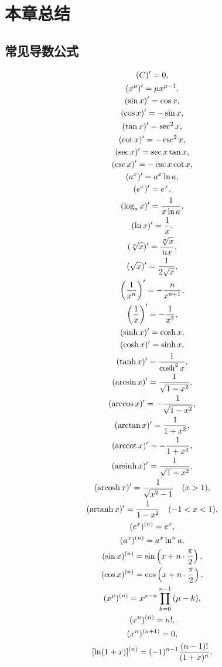 \section{本章总结}
\subsection{常见导数公式}
\begin{gather*}
(C)' = 0, \\
(x^\mu)' = \mu x^{\mu-1}, \\
(\sin x)' = \cos x, \\
(\cos x)' = - \sin x, \\
(\tan x)' = \sec^2 x, \\
(\cot x)' = - \csc^2 x, \\
(\sec x)' = \sec x \tan x, \\
(\csc x)' = - \csc x \cot x, \\
(a^x)' = a^x \ln a, \\
(e^x)' = e^x, \\
(\log_a x)' = \frac{1}{x \ln a}, \\
(\ln x)' = \frac{1}{x}, \\
(\sqrt[n]{x})' = \frac{\sqrt[n]{x}}{n x}, \\
(\sqrt{x})' = \frac{1}{2\sqrt{x}}, \\
\left(\frac{1}{x^n}\right)' = -\frac{n}{x^{n+1}}, \\
\left(\frac{1}{x}\right)' = -\frac{1}{x^2}, \\
(\sinh x)' = \cosh x, \\
(\cosh x)' = \sinh x, \\
(\tanh x)' = \frac{1}{\cosh^2 x}, \\
(\arcsin x)' = \frac{1}{\sqrt{1 - x^2}}, \\
(\arccos x)' = - \frac{1}{\sqrt{1 - x^2}}, \\
(\arctan x)' = \frac{1}{1 + x^2}, \\
(\arccot x)' = - \frac{1}{1 + x^2}, \\
(\arsinh x)' = \frac{1}{\sqrt{1 + x^2}}, \\
(\arcosh x)' = \frac{1}{\sqrt{x^2 - 1}} \quad (x > 1), \\
(\artanh x)' = \frac{1}{1 - x^2} \quad (-1 < x < 1), \\
(e^x)^{(n)} = e^x, \\
(a^x)^{(n)} = a^x \ln^n a, \\
(\sin x)^{(n)} = \sin \left( x + n \cdot \frac{\pi}{2} \right), \\
(\cos x)^{(n)} = \cos \left( x + n \cdot \frac{\pi}{2} \right), \\
(x^\mu)^{(n)} = x^{\mu-n}\prod_{k=0}^{n-1} {(\mu - k)}, \\
(x^n)^{(n)} = n!, \\
(x^n)^{(n+1)} = 0, \\
[\ln(1+x)]^{(n)} = (-1)^{n-1} \frac{(n-1)!}{(1+x)^n}.
\end{gather*}
